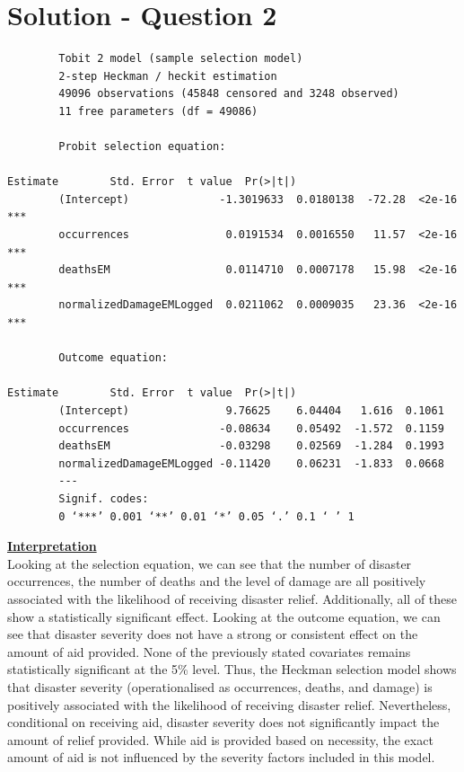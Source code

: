 \documentclass[12pt,letterpaper]{article}
\begin{document}
\section*{Solution - Question 2}
	
	\vspace{.5cm}
	\begin{verbatim}
		Tobit 2 model (sample selection model)
		2-step Heckman / heckit estimation
		49096 observations (45848 censored and 3248 observed)
		11 free parameters (df = 49086)
		
		Probit selection equation:
																											Estimate 		Std. Error 	t value	 Pr(>|t|)   
		(Intercept)              -1.3019633  0.0180138  -72.28  <2e-16 ***
		occurrences               0.0191534  0.0016550   11.57  <2e-16 ***
		deathsEM                  0.0114710  0.0007178   15.98  <2e-16 ***
		normalizedDamageEMLogged  0.0211062  0.0009035   23.36  <2e-16 ***
		
		Outcome equation:
																										Estimate 		Std. Error 	t value	 Pr(>|t|)  
		(Intercept)               9.76625    6.04404   1.616  0.1061
		occurrences              -0.08634    0.05492  -1.572  0.1159
		deathsEM                 -0.03298    0.02569  -1.284  0.1993
		normalizedDamageEMLogged -0.11420    0.06231  -1.833  0.0668
		---
		Signif. codes:  
		0 ‘***’ 0.001 ‘**’ 0.01 ‘*’ 0.05 ‘.’ 0.1 ‘ ’ 1
	\end{verbatim}
	\underline{\textbf{Interpretation}} \\[.2cm]
	Looking at the selection equation, we can see that the number of disaster occurrences, the number of deaths and the level of damage are all positively associated with the likelihood of receiving disaster relief. Additionally, all of these show a statistically significant effect. Looking at the outcome equation, we can see that disaster severity does not have a strong or consistent effect on the amount of aid provided. None of the previously stated covariates remains statistically significant at the 5\% level. Thus, the Heckman selection model shows that disaster severity (operationalised as occurrences, deaths, and damage) is positively associated with the likelihood of receiving disaster relief. Nevertheless, conditional on receiving aid, disaster severity does not significantly impact the amount of relief provided. While aid is provided based on necessity, the exact amount of aid is not influenced by the severity factors included in this model. 
\end{document}
